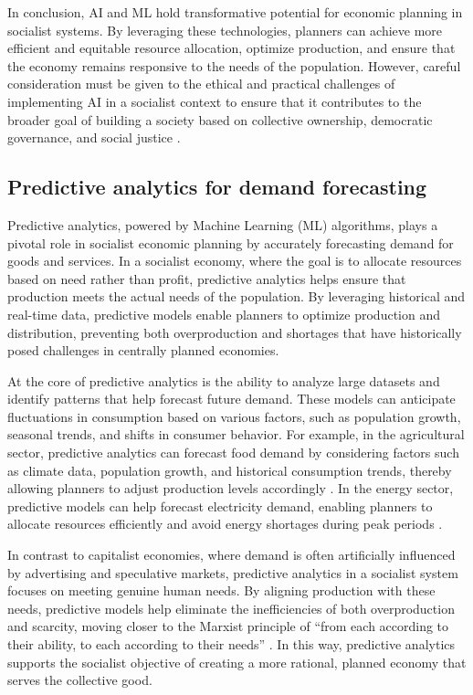 \begin{refsection}
In conclusion, AI and ML hold transformative potential for economic planning in socialist systems. By leveraging these technologies, planners can achieve more efficient and equitable resource allocation, optimize production, and ensure that the economy remains responsive to the needs of the population. However, careful consideration must be given to the ethical and practical challenges of implementing AI in a socialist context to ensure that it contributes to the broader goal of building a society based on collective ownership, democratic governance, and social justice \cite[pp.~245-248]{marx1977}.

\subsection{Predictive analytics for demand forecasting}

Predictive analytics, powered by Machine Learning (ML) algorithms, plays a pivotal role in socialist economic planning by accurately forecasting demand for goods and services. In a socialist economy, where the goal is to allocate resources based on need rather than profit, predictive analytics helps ensure that production meets the actual needs of the population. By leveraging historical and real-time data, predictive models enable planners to optimize production and distribution, preventing both overproduction and shortages that have historically posed challenges in centrally planned economies.

At the core of predictive analytics is the ability to analyze large datasets and identify patterns that help forecast future demand. These models can anticipate fluctuations in consumption based on various factors, such as population growth, seasonal trends, and shifts in consumer behavior. For example, in the agricultural sector, predictive analytics can forecast food demand by considering factors such as climate data, population growth, and historical consumption trends, thereby allowing planners to adjust production levels accordingly \cite[pp.~112-115]{tapscott2016}. In the energy sector, predictive models can help forecast electricity demand, enabling planners to allocate resources efficiently and avoid energy shortages during peak periods \cite[pp.~98-101]{schneider2018}.

In contrast to capitalist economies, where demand is often artificially influenced by advertising and speculative markets, predictive analytics in a socialist system focuses on meeting genuine human needs. By aligning production with these needs, predictive models help eliminate the inefficiencies of both overproduction and scarcity, moving closer to the Marxist principle of “from each according to their ability, to each according to their needs” \cite[pp.~245-248]{marx2023}. In this way, predictive analytics supports the socialist objective of creating a more rational, planned economy that serves the collective good.


\end{refsection}
